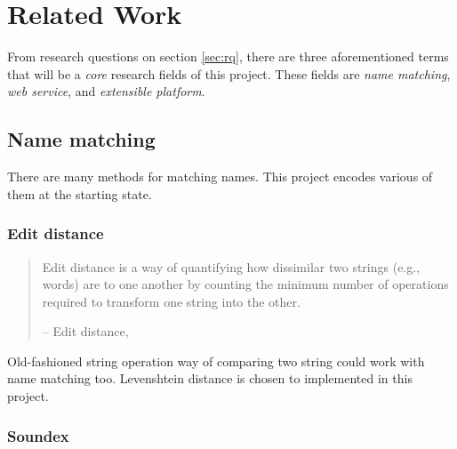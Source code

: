 \chapter{Related Work}
\label{ch:relatedwork}

From research questions on section \ref{sec:rq}, there are three aforementioned
terms that will be a \emph{core} research fields of this project.
These fields are \emph{name matching}, \emph{web service},
and \emph{extensible platform}.

\section{Name matching}

There are many methods for matching names. This project encodes
various of them at the starting state.

\subsection{Edit distance}

\begin{quotation} \noindent
Edit distance is a way of quantifying how dissimilar two strings
(e.g., words) are to one another by counting the minimum number
of operations required to transform one string into the other.

-- Edit distance, \citet{editdistance}
\end{quotation}

Old-fashioned string operation way of comparing two string
could work with name matching too. Levenshtein distance \citep{levenshteindistance}
is chosen to implemented in this project.


\subsection{Soundex}


